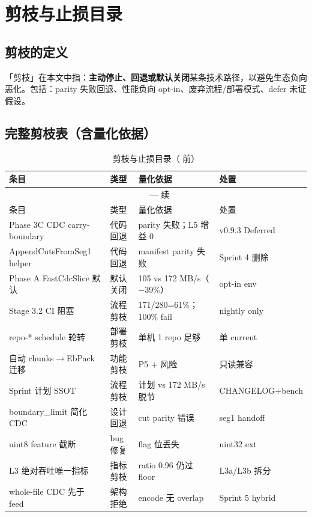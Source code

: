 \chapter{剪枝与止损目录}
\label{ch:pruning}

\section{剪枝的定义}

「剪枝」在本文中指：\textbf{主动停止、回退或默认关闭}某条技术路径，以避免生态负向恶化。包括：parity 失败回退、性能负向 opt-in、废弃流程/部署模式、defer 未证假设。

\section{完整剪枝表（含量化依据）}

\begin{longtable}{@{}llp{3.2cm}p{3.5cm}@{}}
\caption{剪枝与止损目录（ 前）} \\
\toprule
条目 & 类型 & 量化依据 & 处置 \\
\midrule
\endfirsthead
\multicolumn{4}{c}{\tablename\ \thetable{} — 续} \\
\toprule
条目 & 类型 & 量化依据 & 处置 \\
\midrule
\endhead
Phase 3C CDC carry-boundary & 代码回退 & parity 失败；L5 增益 0 & v0.9.3 Deferred \\
AppendCutsFromSeg1 helper & 代码回退 & manifest parity 失败 & Sprint 4 删除 \\
Phase A FastCdcSlice 默认 & 默认关闭 & 105 vs 172 MB/s（$-$39\%） & opt-in env \\
Stage 3.2 CI 阻塞 & 流程剪枝 & 171/280=61\%；100\% fail & nightly only \\
repo-* schedule 轮转 & 部署剪枝 & 单机 1 repo 足够 & 单 current \\
自动 chunks$\rightarrow$EbPack 迁移 & 功能剪枝 & P5 + 风险 & 只读兼容 \\
Sprint 计划 SSOT & 流程剪枝 & 计划 vs 172 MB/s 脱节 & CHANGELOG+bench \\
boundary\_limit 简化 CDC & 设计回退 & cut parity 错误 & seg1 handoff \\
uint8 feature 截断 & bug 修复 & flag 位丢失 & uint32 ext \\
L3 绝对吞吐唯一指标 & 指标剪枝 & ratio 0.96 仍过 floor & L3a/L3b 拆分 \\
whole-file CDC 先于 feed & 架构拒绝 & encode 无 overlap & Sprint 5 hybrid \\
\bottomrule
\end{longtable}

